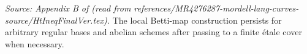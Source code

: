 \begin{proposition}
  \label{prop:betti_map_app}
  \textit{Source: Appendix B of \cite{MR4276287-mordell-lang-curves} (read from references/MR4276287-mordell-lang-curves-source/HtIneqFinalVer.tex).}
  The local Betti-map construction persists for arbitrary regular bases and
  abelian schemes after passing to a finite étale cover when necessary.
\end{proposition}

